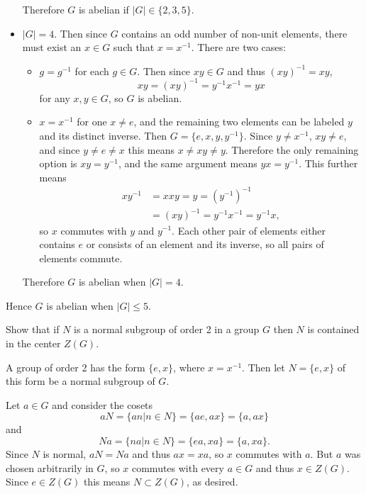 \documentclass{article}
\newcounter{Problem}
\newenvironment{Problem}{\begin{Exercise}[name={Problem},
                                          counter={Problem}]}
                        {\end{Exercise}}
\begin{document}
\begin{Answer}
\begin{itemize}
{        Therefore $G$ is abelian if $|G| \in \{2, 3, 5\}$.
      }
  \item{$|G| = 4$. Then since $G$ contains an odd number of non-unit
      elements, there must exist an $x \in G$ such that $x = x^{-1}$.
      There are two cases:
      \begin{itemize}
        \item{$g = g^{-1}$ for each $g \in G$. Then since $xy \in G$
              and thus $(xy)^{-1} = xy$,
              $$
              xy = (xy)^{-1} = y^{-1} x^{-1} = yx
              $$
              for any $x, y \in G$, so $G$ is abelian.
              }
        \item{$x = x^{-1}$ for one $x \neq e$, and the remaining two
              elements can be labeled $y$ and its distinct inverse.
              Then $G = \{e, x, y, y^{-1}\}$. Since $y \neq x^{-1}$,
              $xy \neq e$, and since $y \neq e \neq x$ this means 
              $x \neq xy \neq y$. Therefore the only remaining option
              is $xy = y^{-1}$, and the same argument means
              $yx = y^{-1}$. This further means
              \begin{align*}
              x y^{-1} &= xxy = y = (y^{-1})^{-1} \\
                      &= (xy)^{-1} = y^{-1} x^{-1} = y^{-1} x,
              \end{align*}
              so $x$ commutes with $y$ and $y^{-1}$. Each other pair
              of elements either contains $e$ or consists of an
              element and its inverse, so all pairs of elements commute.              
             }
      \end{itemize}
       Therefore $G$ is abelian when $|G| = 4$.
       }
\end{itemize}
Hence $G$ is abelian when $|G| \leq 5$.
\end{Answer}

\pagebreak

\begin{Problem}
Show that if $N$ is a normal subgroup of order 2 in a group $G$ then
$N$ is contained in the center $Z(G)$.
\end{Problem}

\begin{Answer}
A group of order 2 has the form $\{ e, x \}$, where $x =
x^{-1}$. Then let $N = \{ e, x \}$ of this form be a normal subgroup
of $G$.

Let $a \in G$ and consider the cosets
$$aN = \{ an | n \in N \} = \{ ae, ax \} = \{ a, ax \}$$
and
$$Na = \{ na | n \in N \} = \{ ea, xa \} = \{ a, xa \}.$$
Since $N$ is normal, $aN = Na$ and thus $ax = xa$, so $x$
commutes with $a$. But $a$ was chosen arbitrarily in $G$, so $x$ commutes
with every $a \in G$ and thus $x \in Z(G)$. Since $e \in Z(G)$ this
means $N \subset Z(G)$, as desired.
\end{Answer}
\end{document}
